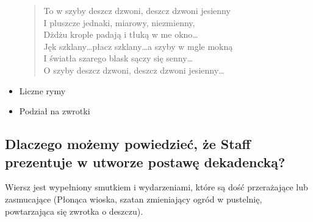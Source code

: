 \documentclass[a4paper]{article}
\begin{document}
\begin{itemize}
\begin{quote}
                To w szyby deszcz dzwoni, deszcz dzwoni jesienny \\
                I pluszcze jednaki, miarowy, niezmienny, \\
                Dżdżu krople padają i tłuką w me okno\dots \\
                Jęk szklany\dots płacz szklany\dots a szyby w mgle mokną \\
                I światła szarego blask sączy się senny\dots \\
                O szyby deszcz dzwoni, deszcz dzwoni jesienny\dots
        \end{quote}
        \item Liczne rymy
        \item Podział na zwrotki
\end{itemize}
\subsection{Dlaczego możemy powiedzieć, że Staff prezentuje w utworze postawę dekadencką?}
Wiersz jest wypełniony smutkiem i wydarzeniami, które są dość przerażające lub zasmucające (Płonąca wioska, szatan zmieniający ogród w pustelnię, powtarzająca się zwrotka o deszczu).
\end{document}
